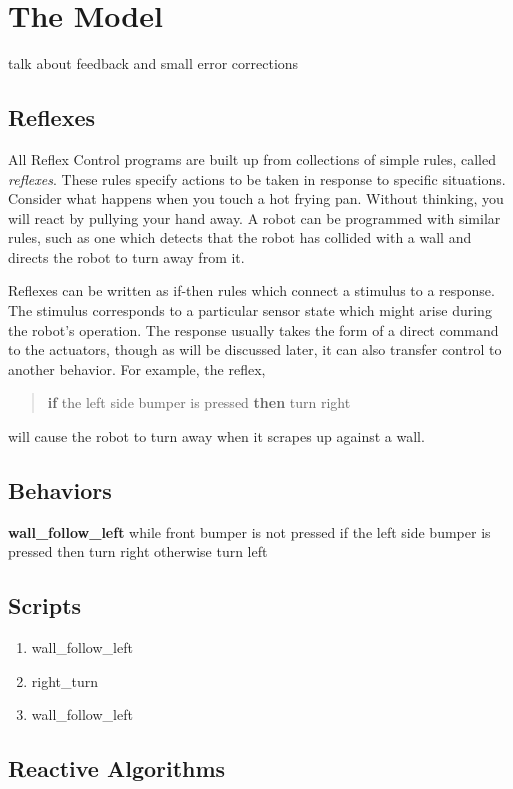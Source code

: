 \section{The Model}

talk about feedback and small error corrections

\subsection{Reflexes}

All Reflex Control programs are built up from collections of simple rules, called {\it reflexes}. These rules specify actions to be taken in response to specific situations. Consider what happens when you touch a hot frying pan. Without thinking, you will react by pullying your hand away. A robot can be programmed with similar rules, such as one which detects that the robot has collided with a wall and directs the robot to turn away from it.

Reflexes can be written as if-then rules which connect a stimulus to a response. The stimulus corresponds to a particular sensor state which might arise during the robot's operation. The response usually takes the form of a direct command to the actuators, though as will be discussed later, it can also transfer control to another behavior. For example, the reflex,

\begin{quote}
{\bf if} the left side bumper is pressed {\bf then} turn right
\end{quote}

will cause the robot to turn away when it scrapes up against a wall.

\subsection{Behaviors}

{\bf wall_follow_left} while front bumper is not pressed
  if the left side bumper is pressed then turn right
  otherwise turn left

\subsection{Scripts}

\begin{enumerate}
\item wall_follow_left
\item right_turn
\item wall_follow_left
\end{enumerate}

\subsection{Reactive Algorithms}
